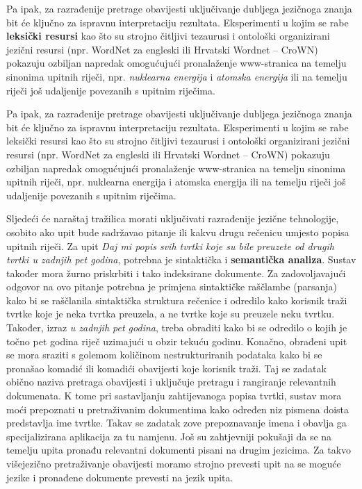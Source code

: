 \begin{multicols}{2}
Pa ipak, za razrađenije pretrage obavijesti uključivanje dubljega jezičnoga znanja bit će ključno za ispravnu interpretaciju rezultata. Eksperimenti u kojim se rabe \textbf{leksički resursi} kao što su strojno čitljivi tezaurusi i ontološki organizirani jezični resursi (npr. WordNet za engleski ili Hrvatski Wordnet – CroWN) pokazuju ozbiljan napredak omogućujući pronalaženje www-stranica na temelju sinonima upitnih riječi, npr. \emph{nuklearna energija} i \emph{atomska energija} ili na temelju riječi još udaljenije povezanih s upitnim riječima.


Pa ipak, za razrađenije pretrage obavijesti uključivanje dubljega jezičnoga znanja bit će ključno za ispravnu interpretaciju rezultata. Eksperimenti u kojim se rabe leksički resursi kao što su strojno čitljivi tezaurusi i ontološki organizirani jezični resursi (npr. WordNet za engleski ili Hrvatski Wordnet – CroWN) pokazuju ozbiljan napredak omogućujući pronalaženje www-stranica na temelju sinonima upitnih riječi, npr. nuklearna energija i atomska energija ili na temelju riječi još udaljenije povezanih s upitnim riječima.

Sljedeći će naraštaj tražilica morati uključivati razrađenije jezične tehnologije, osobito ako upit bude sadržavao pitanje ili kakvu drugu rečenicu umjesto popisa upitnih riječi.  Za upit \emph{Daj mi popis svih tvrtki koje su bile preuzete od drugih tvrtki u zadnjih pet godina}, potrebna je sintaktička i \textbf{semantička analiza}. Sustav također mora žurno priskrbiti i tako indeksirane dokumente. Za zadovoljavajući odgovor na ovo pitanje potrebna je primjena sintaktičke raščlambe (parsanja) kako bi se raščlanila sintaktička struktura rečenice i odredilo kako korisnik traži tvrtke koje je neka tvrtka preuzela, a ne tvrtke koje su preuzele neku tvrtku. Također, izraz \emph{u zadnjih pet godina}, treba obraditi kako bi se odredilo o kojih je točno pet godina riječ uzimajući u obzir tekuću godinu. Konačno, obrađeni upit se mora sraziti s golemom količinom nestrukturiranih podataka kako bi se pronašao komadić ili komadići obavijesti koje korisnik traži. Taj se zadatak obično naziva pretraga obavijesti i uključuje pretragu i rangiranje relevantnih dokumenata. K tome pri sastavljanju zahtijevanoga popisa tvrtki, sustav mora moći prepoznati u pretraživanim dokumentima kako određen niz pismena doista predstavlja ime tvrtke. Takav se zadatak zove prepoznavanje imena i obavlja ga specijalizirana aplikacija za tu namjenu. Još su zahtjevniji pokušaji da se na temelju upita pronađu relevantni dokumenti pisani na drugim jezicima. Za takvo višejezično pretraživanje obavijesti moramo strojno prevesti upit na se moguće jezike i pronađene dokumente prevesti na jezik upita.


\end{multicols}
